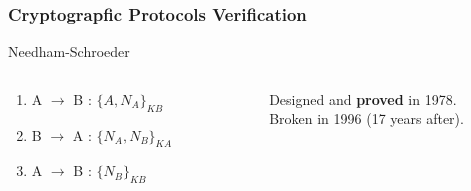 \documentclass{beamer}
\begin{document}
\begin{frame}
    \frametitle{Cryptograpfic Protocols Verification}

    \begin{exampleblock}{Needham-Schroeder}
        \vspace{-.8em}
        \begin{columns}
            \begin{column}{.45\textwidth}
            \begin{enumerate}
                \item A $\rightarrow$ B : $\{A,N_{A}\}_{KB}$
                \item B $\rightarrow$ A : $\{N_{A},N_{B}\}_{KA}$
                \item A $\rightarrow$ B : $\{N_{B}\}_{KB}$
            \end{enumerate}
            \end{column}
            ~
            \begin{column}{.45\textwidth}
                Designed and {\bf proved} in 1978.\\%
                Broken in 1996 (17 years after).\\%
            \end{column}
        \end{columns}
    \end{exampleblock}


\end{frame}
\end{document}
